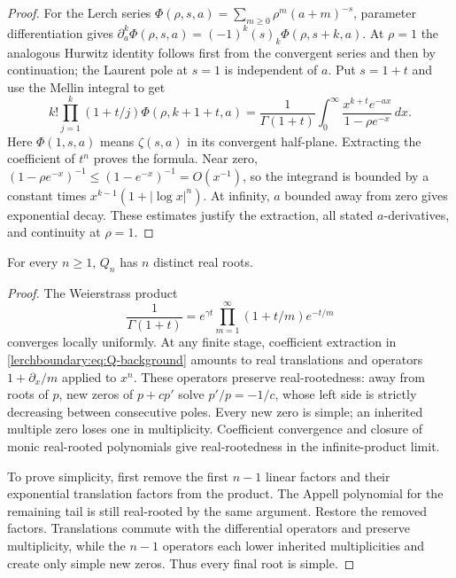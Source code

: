 \begin{proof}
For the Lerch series
$\Phi(\rho,s,a)=\sum_{m\geq0}\rho^m(a+m)^{-s}$,
parameter differentiation gives
$\partial_a^k\Phi(\rho,s,a)=(-1)^k(s)_k\Phi(\rho,s+k,a)$.
At $\rho=1$ the analogous Hurwitz identity follows first from the
convergent series and then by continuation; the Laurent pole at $s=1$
is independent of $a$. Put $s=1+t$ and use the Mellin integral to get
\[
 k!\prod_{j=1}^k(1+t/j)\Phi(\rho,k+1+t,a)
 =\frac1{\Gamma(1+t)}\int_0^\infty
        \frac{x^{k+t}e^{-ax}}{1-\rho e^{-x}}\,dx.
\]
Here $\Phi(1,s,a)$ means $\zeta(s,a)$ in its convergent half-plane.
Extracting the coefficient of $t^n$ proves the formula. Near zero,
$(1-\rho e^{-x})^{-1}\leq(1-e^{-x})^{-1}=O(x^{-1})$,
so the integrand is bounded by a constant times
$x^{k-1}(1+|\log x|^n)$. At infinity, $a$ bounded away from zero
gives exponential decay. These estimates justify the extraction,
all stated $a$-derivatives, and continuity at $\rho=1$.
\end{proof}

\begin{lemma}
\label{lerchboundary:lem:Q-roots-background}
For every $n\geq1$, $Q_n$ has $n$ distinct real roots.
\end{lemma}

\begin{proof}
The Weierstrass product \cite{DLMFGamma}
\[
 \frac1{\Gamma(1+t)}
 =e^{\gamma t}\prod_{m=1}^{\infty}(1+t/m)e^{-t/m}
\]
converges locally uniformly. At any finite stage, coefficient
extraction in \eqref{lerchboundary:eq:Q-background} amounts to real
translations and operators $1+\partial_x/m$ applied to $x^n$.
These operators preserve real-rootedness: away from roots of $p$,
new zeros of $p+cp'$ solve $p'/p=-1/c$, whose left side is strictly
decreasing between consecutive poles. Every new zero is simple;
an inherited multiple zero loses one in multiplicity.
Coefficient convergence and closure of monic real-rooted polynomials
give real-rootedness in the infinite-product limit.

To prove simplicity, first remove the first $n-1$ linear factors and
their exponential translation factors from the product. The Appell
polynomial for the remaining tail is still real-rooted by the same
argument. Restore the removed factors. Translations commute with
the differential operators and preserve multiplicity, while the
$n-1$ operators each lower inherited multiplicities and create only
simple new zeros. Thus every final root is simple.
\end{proof}

